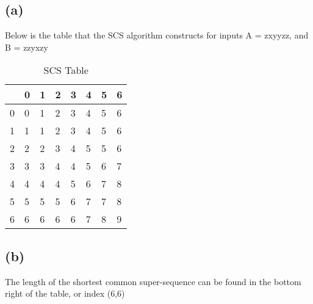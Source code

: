 \documentclass[12pt]{article}
\begin{document}
\subsection*{(a)}
Below is the table that the SCS algorithm constructs for inputs A = zxyyzz, and B = zzyxzy\\
\begin{table}[H]
\centering
\caption{SCS Table}
\label{my-label}
\begin{tabular}{l|lllllll}
  & 0 & 1 & 2 & 3 & 4 & 5 & 6 \\ \hline
0 & 0 & 1 & 2 & 3 & 4 & 5 & 6 \\
1 & 1 & 1 & 2 & 3 & 4 & 5 & 6 \\ 
2 & 2 & 2 & 3 & 4 & 5 & 5 & 6 \\ 
3 & 3 & 3 & 4 & 4 & 5 & 6 & 7 \\ 
4 & 4 & 4 & 4 & 5 & 6 & 7 & 8 \\ 
5 & 5 & 5 & 5 & 6 & 7 & 7 & 8 \\ 
6 & 6 & 6 & 6 & 6 & 7 & 8 & 9
\end{tabular}
\end{table}

\subsection*{(b)}
The length of the shortest common super-sequence can be found in the bottom right of the table, or index (6,6)\\
\end{document}

